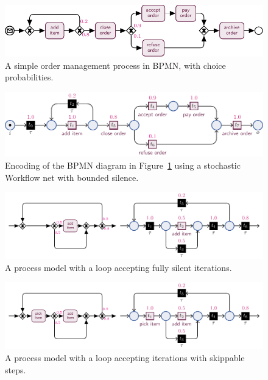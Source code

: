 
\begin{figure}[!t]
	\centering
	\includegraphics[width=.9\textwidth]{images/bpmn-order}
	\caption{A simple order management process in BPMN, with choice probabilities.}\label{fig:bpmn-order}
\end{figure}
\begin{figure}[!t]
		\centering
	\includegraphics[width=.9\textwidth]{images/petri_order}
	\caption{Encoding of the BPMN diagram in Figure~\ref{fig:bpmn-order} using a stochastic Workflow net with bounded silence.}\label{fig:petri_tut}
\end{figure}
\begin{figure}[!t]
	\centering
	\includegraphics[width=1.0\textwidth]{images/skip-iteration}
	\caption{A process model with a loop accepting fully silent iterations.}\label{fig:skip-iteration}
\end{figure}
\begin{figure}[!t]
	\centering
	\includegraphics[width=1.0\textwidth]{images/skip-step}
	\caption{A process model with a loop accepting iterations with skippable steps.}\label{fig:skip-step}
\end{figure}

